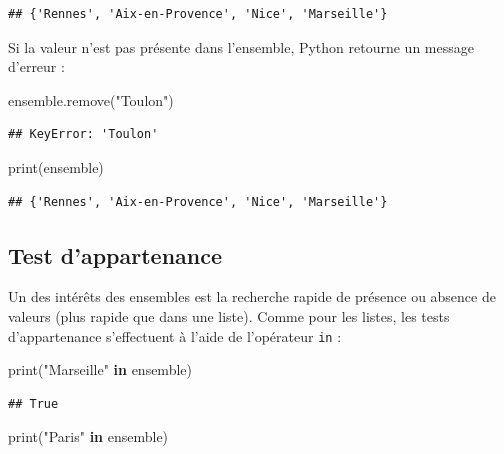 \documentclass[
  12pt,
]{book}
\newenvironment{Shaded}{\begin{snugshade}}{\end{snugshade}}
\newcommand{\BuiltInTok}[1]{#1}
\newcommand{\KeywordTok}[1]{\textcolor[rgb]{0.13,0.29,0.53}{\textbf{#1}}}
\newcommand{\NormalTok}[1]{#1}
\newcommand{\StringTok}[1]{\textcolor[rgb]{0.31,0.60,0.02}{#1}}
\numberwithin{equation}{section}
\numberwithin{countremarque}{section}
\begin{document}
\begin{lstlisting}
## {'Rennes', 'Aix-en-Provence', 'Nice', 'Marseille'}
\end{lstlisting}

Si la valeur n'est pas présente dans l'ensemble, Python retourne un message d'erreur :

\begin{Shaded}
\begin{Highlighting}[]
\NormalTok{ensemble.remove(}\StringTok{"Toulon"}\NormalTok{)}
\end{Highlighting}
\end{Shaded}

\begin{lstlisting}
## KeyError: 'Toulon'
\end{lstlisting}

\begin{Shaded}
\begin{Highlighting}[]
\BuiltInTok{print}\NormalTok{(ensemble)}
\end{Highlighting}
\end{Shaded}

\begin{lstlisting}
## {'Rennes', 'Aix-en-Provence', 'Nice', 'Marseille'}
\end{lstlisting}

\subsection{Test d'appartenance}\label{test-dappartenance-1}

Un des intérêts des ensembles est la recherche rapide de présence ou absence de valeurs (plus rapide que dans une liste). Comme pour les listes, les tests d'appartenance s'effectuent à l'aide de l'opérateur \texttt{in} :

\begin{Shaded}
\begin{Highlighting}[]
\BuiltInTok{print}\NormalTok{(}\StringTok{"Marseille"} \KeywordTok{in}\NormalTok{ ensemble)}
\end{Highlighting}
\end{Shaded}

\begin{lstlisting}
## True
\end{lstlisting}

\begin{Shaded}
\begin{Highlighting}[]
\BuiltInTok{print}\NormalTok{(}\StringTok{"Paris"} \KeywordTok{in}\NormalTok{ ensemble)}
\end{Highlighting}
\end{Shaded}
\end{document}
